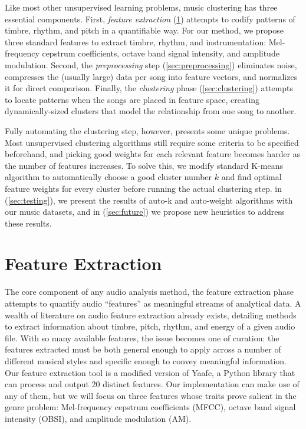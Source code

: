 \documentclass[12pt,twocolumn,titlepage]{article}
\begin{document}
Like most other unsupervised learning problems, music clustering has three essential components. First, \emph{feature extraction} (\ref{sec:feature}) attempts to codify patterns of timbre, rhythm, and pitch in a quantifiable way. For our method, we propose three standard features to extract timbre, rhythm, and instrumentation: Mel-frequency cepstrum coefficients, octave band signal intensity, and amplitude modulation. Second, the \emph{preprocessing} step (\ref{sec:preprocessing}) eliminates noise, compresses the (usually large) data per song into feature vectors, and normalizes it for direct comparison. Finally, the \emph{clustering} phase (\ref{sec:clustering}) attempts to locate patterns when the songs are placed in feature space, creating dynamically-sized clusters that model the relationship from one song to another.

Fully automating the clustering step, however, presents some unique problems. Most unsupervised clustering algorithms still require some criteria to be specified beforehand, and picking good weights for each relevant feature becomes harder as the number of features increases. To solve this, we modify standard K-means algorithm to automatically choose a good cluster number $k$ and find optimal feature weights for every cluster before running the actual clustering step. in (\ref{sec:testing}), we present the results of auto-k and auto-weight algorithms with our music datasets, and in (\ref{sec:future}) we propose new heuristics to address these results.


\section{Feature Extraction}
\label{sec:feature}

The core component of any audio analysis method, the feature extraction phase attempts to quantify audio ``features'' as meaningful streams of analytical data. A wealth of literature on audio feature extraction already exists, detailing methods to extract information about timbre, pitch, rhythm, and energy of a given audio file. With so many available features, the issue becomes one of curation: the features extracted must be both general enough to apply across a number of different musical styles and specific enough to convey meaningful information. Our feature extraction tool is a modified version of Yaafe, a Python library that can process and output 20 distinct features. \cite{yaafe} Our implementation can make use of any of them, but we will focus on three features whose traits prove salient in the genre problem: Mel-frequency cepstrum coefficients (MFCC), octave band signal intensity (OBSI), and amplitude modulation (AM). 
\end{document}
